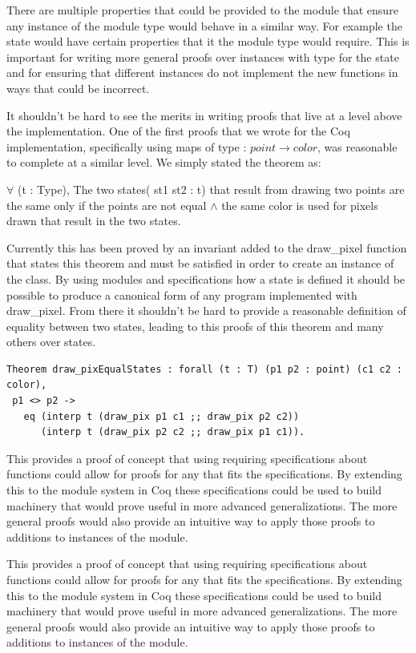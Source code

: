 \documentclass{llncs}
\begin{document}
There are multiple properties that could be provided to the module that ensure any instance of the module type would behave in a similar way.  For example the state would have certain properties that it the module type would require.  This is important for writing more general proofs over instances with type for the state and for ensuring that different instances do not implement the new functions in ways that could be incorrect.

It shouldn't be hard to see the merits in writing proofs that live at a level above the implementation.  One of the first proofs that we wrote for the Coq implementation, specifically using maps of type : $point \rightarrow color$, was reasonable to complete at a similar level.  We simply stated the theorem as:
\begin{theorem}
  $\forall$ (t : Type), The two states( st1 st2 : t) that result from drawing two points are the same only if the points are not equal $\land$ the same color is used for pixels drawn that result in the two states.
\end{theorem}

Currently this has been proved by an invariant added to the draw\_pixel function that states this theorem and must be satisfied in order to create an instance of the class.  By using modules and specifications how a state is defined it should be possible to produce a canonical form of any program implemented with draw\_pixel.  From there it shouldn't be hard to provide a reasonable definition of equality between two states, leading to this proofs of this theorem and many others over states.

\begin{lstlisting}
Theorem draw_pixEqualStates : forall (t : T) (p1 p2 : point) (c1 c2 : color),
 p1 <> p2 -> 
   eq (interp t (draw_pix p1 c1 ;; draw_pix p2 c2))
      (interp t (draw_pix p2 c2 ;; draw_pix p1 c1)).
\end{lstlisting}

This provides a proof of concept that using requiring specifications about functions could allow for proofs for any that fits the specifications.
By extending this to the module system in Coq these specifications could be used to build machinery that would prove useful in more advanced generalizations.  The more general proofs would also provide an intuitive way to apply those proofs to additions to instances of the module.

This provides a proof of concept that using requiring specifications about functions could allow for proofs for any that fits the specifications.
By extending this to the module system in Coq these specifications could be used to build machinery that would prove useful in more advanced generalizations.  The more general proofs would also provide an intuitive way to apply those proofs to additions to instances of the module.
\end{document}
